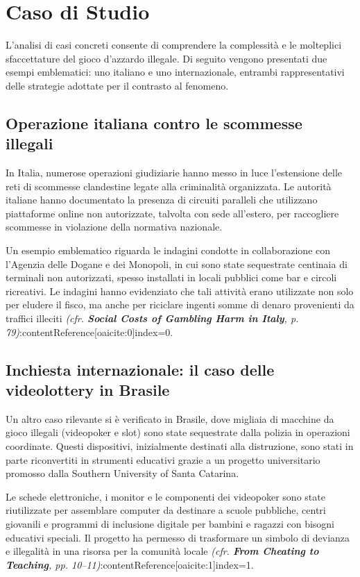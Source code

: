 \documentclass[a4paper,12pt]{article}
\begin{document}
\section{Caso di Studio}

L’analisi di casi concreti consente di comprendere la complessità e le molteplici sfaccettature del gioco d’azzardo illegale. Di seguito vengono presentati due esempi emblematici: uno italiano e uno internazionale, entrambi rappresentativi delle strategie adottate per il contrasto al fenomeno.

\subsection{Operazione italiana contro le scommesse illegali}

In Italia, numerose operazioni giudiziarie hanno messo in luce l’estensione delle reti di scommesse clandestine legate alla criminalità organizzata. Le autorità italiane hanno documentato la presenza di circuiti paralleli che utilizzano piattaforme online non autorizzate, talvolta con sede all’estero, per raccogliere scommesse in violazione della normativa nazionale.

Un esempio emblematico riguarda le indagini condotte in collaborazione con l’Agenzia delle Dogane e dei Monopoli, in cui sono state sequestrate centinaia di terminali non autorizzati, spesso installati in locali pubblici come bar e circoli ricreativi. Le indagini hanno evidenziato che tali attività erano utilizzate non solo per eludere il fisco, ma anche per riciclare ingenti somme di denaro provenienti da traffici illeciti \textit{(cfr. \textbf{Social Costs of Gambling Harm in Italy}, p. 79)}:contentReference[oaicite:0]{index=0}.

\subsection{Inchiesta internazionale: il caso delle videolottery in Brasile}

Un altro caso rilevante si è verificato in Brasile, dove migliaia di macchine da gioco illegali (videopoker e slot) sono state sequestrate dalla polizia in operazioni coordinate. Questi dispositivi, inizialmente destinati alla distruzione, sono stati in parte riconvertiti in strumenti educativi grazie a un progetto universitario promosso dalla Southern University of Santa Catarina.

Le schede elettroniche, i monitor e le componenti dei videopoker sono state riutilizzate per assemblare computer da destinare a scuole pubbliche, centri giovanili e programmi di inclusione digitale per bambini e ragazzi con bisogni educativi speciali. Il progetto ha permesso di trasformare un simbolo di devianza e illegalità in una risorsa per la comunità locale \textit{(cfr. \textbf{From Cheating to Teaching}, pp. 10--11)}:contentReference[oaicite:1]{index=1}.
\end{document}

